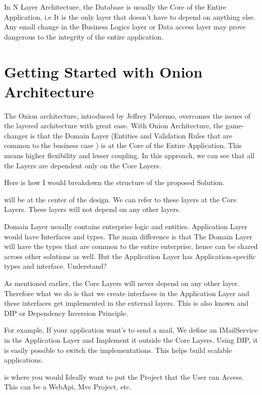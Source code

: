 \documentclass[letterpaper,10pt,english]{sphinxmanual}
\begin{document}
In N Layer Architecture, the Database is usually the Core of the Entire Application, i.e It is the only layer that doesn’t have to depend on anything else. Any small change in the Business Logics layer or Data access layer may prove dangerous to the integrity of the entire application.


\chapter{Getting Started with Onion Architecture}
\label{\detokenize{OnionArchitecture/details:getting-started-with-onion-architecture}}
The Onion architecture, introduced by Jeffrey Palermo, overcomes the issues of the layered architecture with great ease. With Onion Architecture, the game-changer is that the Domain Layer (Entities and Validation Rules that are common to the business case ) is at the Core of the Entire Application. This means higher flexibility and lesser coupling. In this approach, we can see that all the Layers are dependent only on the Core Layers.

\noindent{}

Here is how I would breakdown the structure of the proposed Solution.

 will be at the center of the design. We can refer to these layers at the Core Layers. These layers will not depend on any other layers.

Domain Layer usually contains enterprise logic and entities. Application Layer would have Interfaces and types. The main difference is that The Domain Layer will have the types that are common to the entire enterprise, hence can be shared across other solutions as well. But the Application Layer has Application-specific types and interface. Understand?

As mentioned earlier, the Core Layers will never depend on any other layer. Therefore what we do is that we create interfaces in the Application Layer and these interfaces get implemented in the external layers. This is also known and DIP or Dependency Inversion Principle.

For example, If your application want’s to send a mail, We define an IMailService in the Application Layer and Implement it outside the Core Layers. Using DIP, it is easily possible to switch the implementations. This helps build scalable applications.

 is where you would Ideally want to put the Project that the User can Access. This can be a WebApi, Mvc Project, etc.
\end{document}
